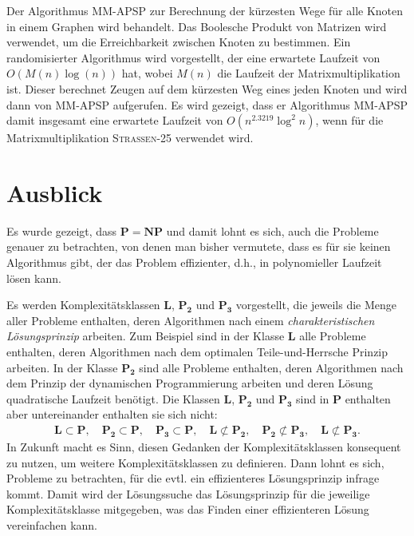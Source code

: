 \documentclass{scrartcl}
\numberwithin{equation}{section}
\begin{document}
Der Algorithmus MM-APSP zur Berechnung der kürzesten Wege für alle Knoten in einem Graphen wird behandelt. Das Boolesche Produkt von Matrizen wird verwendet, um die Erreichbarkeit zwischen Knoten zu bestimmen. Ein randomisierter Algorithmus wird vorgestellt, der eine erwartete Laufzeit von $O(M(n) \log(n))$ hat, wobei $M(n)$ die Laufzeit der Matrixmultiplikation ist. Dieser berechnet Zeugen auf dem kürzesten Weg eines jeden Knoten und wird dann von MM-APSP aufgerufen. Es wird gezeigt, dass er Algorithmus MM-APSP damit insgesamt eine erwartete Laufzeit von $O(n^{2.3219} \log^2 n)$, wenn für die Matrixmultiplikation \textsc{Strassen-25} verwendet wird.

\section{Ausblick}
Es wurde gezeigt, dass $\mathbf{P} = \mathbf{NP}$ und damit lohnt es sich, auch die Probleme genauer zu betrachten, von denen man bisher vermutete, dass es für sie keinen Algorithmus gibt, der das Problem effizienter, d.h., in polynomieller Laufzeit lösen kann.

Es werden Komplexitätsklassen $\mathbf{L}$, $\mathbf{P_2}$ und $\mathbf{P_3}$ vorgestellt, die jeweils die Menge aller Probleme enthalten, deren Algorithmen nach einem \textit{charakteristischen Lösungsprinzip} arbeiten. Zum Beispiel sind in der Klasse $\mathbf{L}$ alle Probleme enthalten, deren Algorithmen nach dem optimalen Teile-und-Herrsche Prinzip arbeiten. In der Klasse $\mathbf{P_2}$ sind alle Probleme enthalten, deren Algorithmen nach dem Prinzip der dynamischen Programmierung arbeiten und deren Lösung quadratische Laufzeit benötigt. Die Klassen $\mathbf{L}$, $\mathbf{P_2}$ und $\mathbf{P_3}$ sind in $\mathbf{P}$ enthalten aber untereinander enthalten sie sich nicht:
\begin{align*}
	\mathbf{L} \subset \mathbf{P}, \quad \mathbf{P_2} \subset \mathbf{P}, \quad \mathbf{P_3} \subset \mathbf{P}, \quad \mathbf{L} \not \subset \mathbf{P_2}, \quad \mathbf{P_2} \not \subset \mathbf{P_3}, \quad \mathbf{L} \not \subset \mathbf{P_3}.
\end{align*}
In Zukunft macht es Sinn, diesen Gedanken der Komplexitätsklassen konsequent zu nutzen, um weitere Komplexitätsklassen zu definieren. Dann lohnt es sich, Probleme zu betrachten, für die evtl. ein effizienteres Lösungsprinzip infrage kommt. Damit wird der Lösungssuche das Lösungsprinzip für die jeweilige Komplexitätsklasse mitgegeben, was das Finden einer effizienteren Lösung vereinfachen kann.
\end{document}
